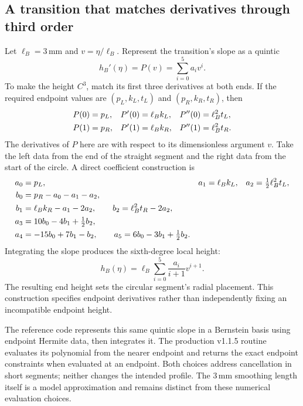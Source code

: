 \documentclass[11pt,letterpaper]{article}
\numberwithin{equation}{section}
\newcommand{\half}{\tfrac12}
\begin{document}
\subsection{A transition that matches derivatives through third order}

Let $\ell_B=3\,\mathrm{mm}$ and $v=\eta/\ell_B$. Represent the transition's slope as a quintic
\begin{equation}
  h_B'(\eta)=P(v)=\sum_{i=0}^{5}a_iv^i.
\end{equation}
To make the height $C^3$, match its first three derivatives at both ends. If the required endpoint values are $(p_L,k_L,t_L)$ and $(p_R,k_R,t_R)$, then
\begin{align}
 P(0)&=p_L,& P'(0)&=\ell_Bk_L,&P''(0)&=\ell_B^2t_L,\notag\\
 P(1)&=p_R,& P'(1)&=\ell_Bk_R,&P''(1)&=\ell_B^2t_R.
 \label{eq:blend-conditions}
\end{align}
The derivatives of $P$ here are with respect to its dimensionless argument $v$. Take the left data from the end of the straight segment and the right data from the start of the circle. A direct coefficient construction is
\begin{align}
 a_0&=p_L,&a_1&=\ell_Bk_L,&a_2&=\half\ell_B^2t_L,\notag\\
 b_0&=p_R-a_0-a_1-a_2,\notag\\
 b_1&=\ell_Bk_R-a_1-2a_2,\qquad
 b_2=\ell_B^2t_R-2a_2,\notag\\
 a_3&=10b_0-4b_1+\half b_2,\notag\\
 a_4&=-15b_0+7b_1-b_2,\qquad
 a_5=6b_0-3b_1+\half b_2.
 \label{eq:blend-coefficients}
\end{align}
Integrating the slope produces the sixth-degree local height:
\begin{equation}
 h_B(\eta)=\ell_B\sum_{i=0}^{5}\frac{a_i}{i+1}v^{i+1}.
\end{equation}
The resulting end height sets the circular segment's radial placement. This construction specifies endpoint derivatives rather than independently fixing an incompatible endpoint height.

The reference code represents this same quintic slope in a Bernstein basis using endpoint Hermite data, then integrates it. The production v1.1.5 routine evaluates its polynomial from the nearer endpoint and returns the exact endpoint constraints when evaluated at an endpoint. Both choices address cancellation in short segments; neither changes the intended profile. The $3\,\mathrm{mm}$ smoothing length itself is a model approximation and remains distinct from these numerical evaluation choices.
\end{document}
